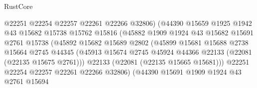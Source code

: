 \begin{lexlean}{RustCore}
\begin{coremodule}
                                    @22251
                                    @22254
                                    @22257
                                    @22261
                                    @22266
                                    @32806)
                                  (@44390
                                    @15659
                                    @1925
                                    @1942
                                    @43
                                    @15682
                                    @15738
                                    @15762
                                    @15816
                                    (@45882
                                      @1909
                                      @1924
                                      @43
                                      @15682
                                      @15691
                                      @2761
                                      @15738
                                      (@45892
                                        @15682
                                        @15689
                                        @2802
                                        (@45899
                                          @15681
                                          @15688
                                          @2738
                                          @15664
                                          @2745
                                          @44345
                                          (@45913
                                            @15674
                                            @2745
                                            @45924
                                            @44366
                                            @22133
                                            (@22081 (@22135 @15675 @2761)))
                                          @22133
                                          (@22081 (@22135 @15665 @15681)))
                                        @22251
                                        @22254
                                        @22257
                                        @22261
                                        @22266
                                        @32806)
                                      (@44390
                                        @15691
                                        @1909
                                        @1924
                                        @43
                                        @2761
                                        @15694

\end{coremodule}
\end{lexlean}
